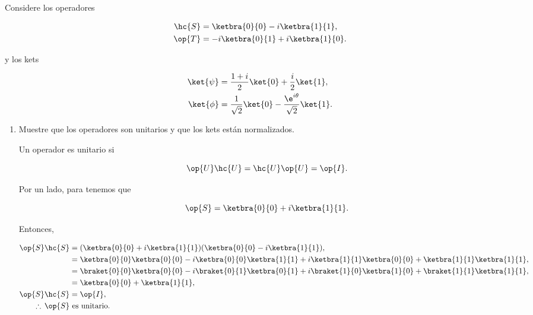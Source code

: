 \documentclass[./../main.tex]{subfiles}
\begin{document}
\begin{problema}
	Considere los operadores

	\begin{align}
		\hc{S} & = \ketbra{0}{0} - i\ketbra{1}{1},\label{eq:s_op-conjugate} \\
		\op{T} & = -i\ketbra{0}{1} + i\ketbra{1}{0}\label{eq:t_op}.
	\end{align}

	y los kets

	\begin{align}
		\ket{\psi} & = \dfrac{1 + i}{2}\ket{0} + \dfrac{i}{2}\ket{1},\label{eq:psi_ket}                      \\
		\ket{\phi} & = \dfrac{1}{\sqrt{2}}\ket{0} - \dfrac{\e^{i\theta}}{\sqrt{2}}\ket{1}.\label{eq:phi_ket}
	\end{align}

	\begin{enumerate}
		\item Muestre que los operadores son unitarios y que los kets están normalizados.

		      \startsolution

		      Un operador es unitario si

		      \begin{equation*}
			      \op{U}\hc{U} = \hc{U}\op{U} = \op{I}.
		      \end{equation*}

		      Por un lado, para  tenemos que

		      \begin{equation*}
			      \op{S} = \ketbra{0}{0} + i\ketbra{1}{1}.
		      \end{equation*}

		      Entonces,

		      \begin{align*}
			      \op{S}\hc{S}        & = (\ketbra{0}{0} + i\ketbra{1}{1})(\ketbra{0}{0} - i\ketbra{1}{1}),                                                    \\
			                          & = \ketbra{0}{0}\ketbra{0}{0} - i\ketbra{0}{0}\ketbra{1}{1} + i\ketbra{1}{1}\ketbra{0}{0} + \ketbra{1}{1}\ketbra{1}{1}, \\
			                          & = \braket{0}{0}\ketbra{0}{0} - i\braket{0}{1}\ketbra{0}{1} + i\braket{1}{0}\ketbra{1}{0} + \braket{1}{1}\ketbra{1}{1}, \\
			                          & = \ketbra{0}{0} + \ketbra{1}{1},                                                                                       \\
			      \op{S}\hc{S}        & = \op{I},                                                                                                              \\
			      \therefore\, \op{S} & \text{ es unitario}.
		      \end{align*}


\end{enumerate}
\end{problema}
\end{document}
